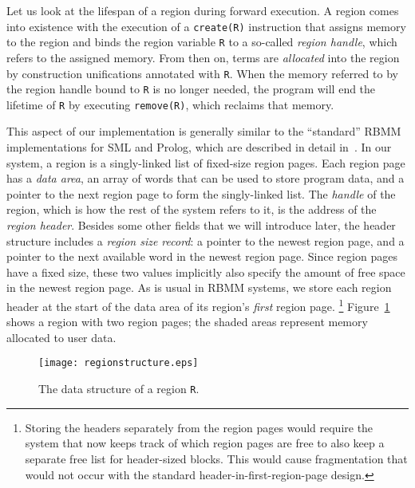 \documentclass{tlp}
\newcommand{\code}[1]{{\tt#1}}
\begin{document}
Let us look at the lifespan of a region during forward execution.
A region comes into existence
with the execution of a \code{create(R)} instruction
that assigns memory to the region and
binds the region variable \code{R} to a so-called {\em region handle},
which refers to the assigned memory.
From then on, terms are \emph{allocated} into the region
by construction unifications annotated with \code{R}.
When the memory referred to by the region handle bound to \code{R}
is no longer needed,
the program will end the lifetime of \code{R}
by executing \code{remove(R)}, which reclaims that memory.

This aspect of our implementation is generally similar to
the ``standard'' RBMM implementations for SML and Prolog,
which are described in detail in~\cite{Makholm00,Makholm00master}.
In our system, a region is a singly-linked list of fixed-size region pages.
Each region page has a \emph{data area},
an array of words that can be used to store program data,
and a pointer to the next region page to form the singly-linked list.
The \emph{handle} of the region,
which is how the rest of the system refers to it,
is the address of the \emph{region header}.
Besides some other fields that we will introduce later,
the header structure includes a \emph{region size record}:
a pointer to the newest region page,
and a pointer to the next available word in the newest region page.
Since region pages have a fixed size,
these two values implicitly also specify
the amount of free space in the newest region page.
As is usual in RBMM systems, we store each region header
at the start of the data area of its region's \emph{first} region page.
\footnote{
Storing the headers separately from the region pages
would require the system that now keeps track of which region pages are free
to also keep a separate free list for header-sized blocks.
This would cause fragmentation that would not occur
with the standard header-in-first-region-page design.
}
Figure~\ref{fig:regionstructure} shows a region with two region pages;
the shaded areas represent memory allocated to user data.

\begin{figure}[htp]
    \centering
    \texttt{[image: regionstructure.eps]}
    \small
    \caption{The data structure of a region \code{R}.}
    \normalsize
    \label{fig:regionstructure}
\end{figure}
\end{document}
